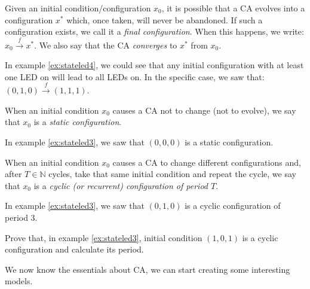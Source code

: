\begin{definition}
\label{def:finalconf}
Given an initial condition/configuration $x_0$, 
it is possible that a CA evolves into a configuration
$x^\ast$ which, once taken, will never be abandoned. If such a configuration exists, we call it
a \textit{final configuration}. When this happens, we write:
$x_0 \overset{f}{\rightarrow} x^\ast$.
We also say that the CA \textit{converges} to $x^\ast$ from $x_0$.
\end{definition}

In example \ref{ex:stateled4}, we could see that any initial configuration with at least one
LED on will lead to all LEDs on. In the specific case, we saw that:
$(0,1,0) \overset{f}{\rightarrow} (1,1,1)$.

\begin{proposition}
When an initial condition $x_0$ causes a CA not to change (not to evolve), we say that
$x_0$ is a \textit{static configuration}.
\end{proposition}

In example \ref{ex:stateled3}, we saw that $(0,0,0)$ is a static configuration.

\begin{proposition}
When an initial condition $x_0$ causes a CA to change different configurations and, after
$T \in \mathbb{N}$ cycles, take that same initial condition and repeat the cycle, we say
that $x_0$ is a \textit{cyclic (or recurrent) configuration of period $T$}.
\end{proposition}

In example \ref{ex:stateled3}, we saw that $(0,1,0)$ is a cyclic configuration of period 3.

\begin{problem}
Prove that, in example \ref{ex:stateled3}, initial condition $(1,0,1)$ is a cyclic configuration
and calculate its period.
\end{problem}

We now know the essentials about CA, we can start creating some interesting models.

